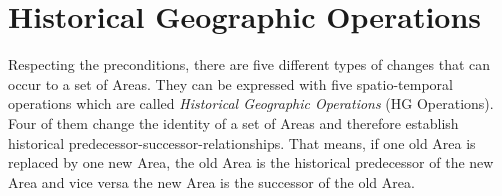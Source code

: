 
\section{Historical Geographic Operations} %
\label{sec:historical_geographic_operations}

Respecting the preconditions, there are five different types of changes that can occur to a set of Areas. They can be expressed with five spatio-temporal operations which are called \emph{Historical Geographic Operations} (HG Operations). Four of them change the identity of a set of Areas and therefore establish historical predecessor-successor-relationships. That means, if one old Area is replaced by one new Area, the old Area is the historical predecessor of the new Area and vice versa the new Area is the successor of the old Area.

